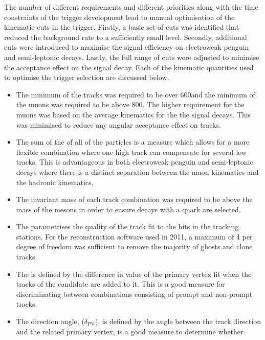 The number of different requirements and different priorities along with the time constraints of the trigger development lead to manual optimisation of the kinematic cuts in the \muntrack trigger.
Firstly, a basic set of cuts was identified that reduced the background rate to a sufficiently small level.
Secondly, additional cuts were introduced to maximise the signal efficiency on electroweak penguin and semi-leptonic decays.
Lastly, the full range of cuts were adjusted to minimise the acceptance effect on the \BdToKstmm signal decay.
Each of the kinematic quantities used to optimise the trigger selection are discussed below.
\begin{itemize}
\item The minimum \pt of the tracks was required to be over 600\mev and the minimum \pt of the muons was required to be above 800\mev.
The higher \pt requirement for the muons was based on the average kinematics for the the signal decays.
This was minimised to reduce any angular acceptance effect on \BdToKstmm tracks.
\item The sum of the \pt of all of the particles is a measure which allows for a more flexible combination
 where one high \pt track can compensate for several low \pt tracks.
 This is advantageous in both electroweak penguin and  semi-leptonic \B decays where there is a distinct separation between
  the muon kinematics and the hadronic kinematics.
\item The invariant mass of each track combination was required to be above the mass of the \D mesons in order to ensure decays with a \bquark quark are selected.
\item The \trchisq parametrises the quality of the track fit to the hits in the tracking stations. 
For the reconstruction software used in 2011, a maximum \trchisq of 4 per degree of freedom was sufficient to remove the majority of ghosts and clone tracks.
\item The \fdchisq is defined by the difference in \chisq value of the primary vertex fit when the tracks of the candidate are added to it.
This is a good measure for discriminating between combinations consisting of prompt and non-prompt tracks.
\item The direction angle, ($\delta_{\mathrm{PV}}$), is defined by the angle between the track direction and the related primary vertex, is a good measure to determine whether

\end{itemize}
